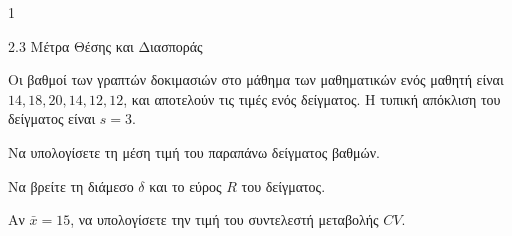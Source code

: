 \begin{ylh}{1}
    \item 2.3 Μέτρα Θέσης και Διασποράς
\end{ylh}
Οι βαθμοί των γραπτών δοκιμασιών στο μάθημα των μαθηματικών ενός μαθητή είναι $14, 18, 20, 14, 12, 12$, και αποτελούν τις τιμές ενός δείγματος. Η τυπική απόκλιση του δείγματος είναι $s=3$.
\begin{alist}
\item Να υπολογίσετε τη μέση τιμή του παραπάνω δείγματος βαθμών. 
\item Να βρείτε τη διάμεσο $\delta$ και το εύρος $R$ του δείγματος. 
\item Αν $\bar{x} =15$, να υπολογίσετε την τιμή του συντελεστή μεταβολής $CV$. 
\end{alist}

